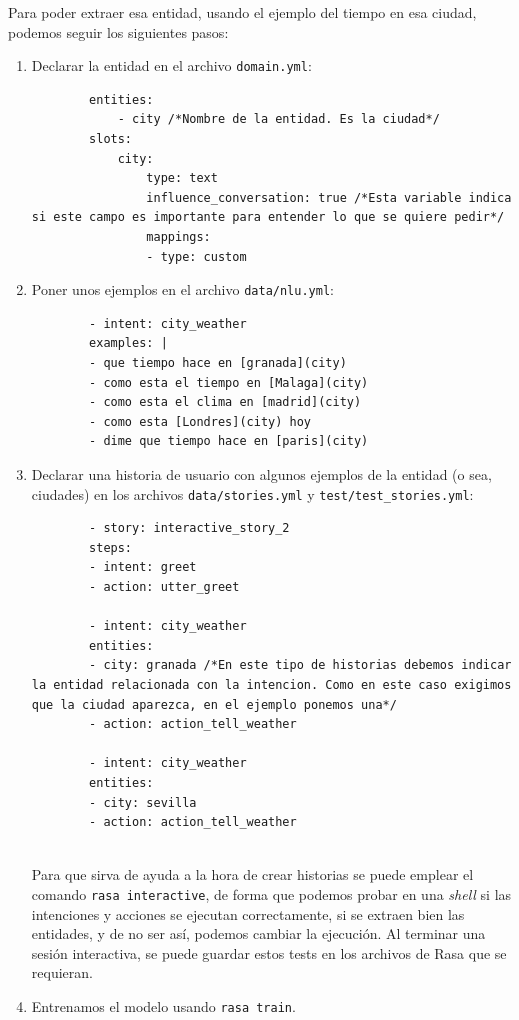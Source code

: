 Para poder extraer esa entidad, usando el ejemplo del tiempo en esa ciudad, podemos seguir los siguientes pasos:
\begin{enumerate}
	\item Declarar la entidad en el archivo \texttt{domain.yml}:
	\begin{lstlisting}
		entities:
			- city /*Nombre de la entidad. Es la ciudad*/
		slots:
			city:
				type: text
				influence_conversation: true /*Esta variable indica si este campo es importante para entender lo que se quiere pedir*/
				mappings:
				- type: custom
	\end{lstlisting}
	\item Poner unos ejemplos en el archivo \texttt{data/nlu.yml}:
	\begin{lstlisting}
		- intent: city_weather
		examples: |
		- que tiempo hace en [granada](city)
		- como esta el tiempo en [Malaga](city)
		- como esta el clima en [madrid](city)
		- como esta [Londres](city) hoy
		- dime que tiempo hace en [paris](city)
	\end{lstlisting}
	\item Declarar una historia de usuario con algunos ejemplos de la entidad (o sea, ciudades) en los archivos  \texttt{data/stories.yml} y  \texttt{test/test\_stories.yml}:
	\begin{lstlisting}
		- story: interactive_story_2
		steps:
		- intent: greet
		- action: utter_greet
		
		- intent: city_weather
		entities:
		- city: granada /*En este tipo de historias debemos indicar la entidad relacionada con la intencion. Como en este caso exigimos que la ciudad aparezca, en el ejemplo ponemos una*/
		- action: action_tell_weather
		
		- intent: city_weather
		entities:
		- city: sevilla
		- action: action_tell_weather
		
	\end{lstlisting}

	Para que sirva de ayuda a la hora de crear historias se puede emplear el comando \texttt{rasa interactive}, de forma que podemos probar en una \textit{shell} si las intenciones y acciones se ejecutan correctamente, si se extraen bien las entidades, y de no ser así, podemos cambiar la ejecución. Al terminar una sesión interactiva, se puede guardar estos tests en los archivos de Rasa que se requieran.
	
	\item Entrenamos el modelo usando \texttt{rasa train}.
\end{enumerate}

